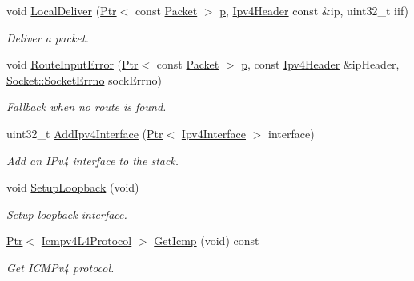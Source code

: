 \begin{DoxyCompactItemize}
void \hyperlink{classns3_1_1Ipv4L3Protocol_aa64669f000ce115efafd5e086995b4ff}{Local\+Deliver} (\hyperlink{classns3_1_1Ptr}{Ptr}$<$ const \hyperlink{classns3_1_1Packet}{Packet} $>$ \hyperlink{lte__link__budget__x2__handover__measures_8m_ac9de518908a968428863f829398a4e62}{p}, \hyperlink{classns3_1_1Ipv4Header}{Ipv4\+Header} const \&ip, uint32\+\_\+t iif)
\begin{DoxyCompactList}\small\item\em Deliver a packet. \end{DoxyCompactList}\item 
void \hyperlink{classns3_1_1Ipv4L3Protocol_a39611a6da4b2d975e3eae9cebf6da6eb}{Route\+Input\+Error} (\hyperlink{classns3_1_1Ptr}{Ptr}$<$ const \hyperlink{classns3_1_1Packet}{Packet} $>$ \hyperlink{lte__link__budget__x2__handover__measures_8m_ac9de518908a968428863f829398a4e62}{p}, const \hyperlink{classns3_1_1Ipv4Header}{Ipv4\+Header} \&ip\+Header, \hyperlink{classns3_1_1Socket_ada1328c5ae0c28cb2a982caf8f6d6cca}{Socket\+::\+Socket\+Errno} sock\+Errno)
\begin{DoxyCompactList}\small\item\em Fallback when no route is found. \end{DoxyCompactList}\item 
uint32\+\_\+t \hyperlink{classns3_1_1Ipv4L3Protocol_afd3f97720c2d1af22f05038fcdb6e089}{Add\+Ipv4\+Interface} (\hyperlink{classns3_1_1Ptr}{Ptr}$<$ \hyperlink{classns3_1_1Ipv4Interface}{Ipv4\+Interface} $>$ interface)
\begin{DoxyCompactList}\small\item\em Add an I\+Pv4 interface to the stack. \end{DoxyCompactList}\item 
void \hyperlink{classns3_1_1Ipv4L3Protocol_aa37b950d26063e4e7ee659e599c83bde}{Setup\+Loopback} (void)
\begin{DoxyCompactList}\small\item\em Setup loopback interface. \end{DoxyCompactList}\item 
\hyperlink{classns3_1_1Ptr}{Ptr}$<$ \hyperlink{classns3_1_1Icmpv4L4Protocol}{Icmpv4\+L4\+Protocol} $>$ \hyperlink{classns3_1_1Ipv4L3Protocol_a4dd2b3a24817ed50e7a6f41a5657551c}{Get\+Icmp} (void) const 
\begin{DoxyCompactList}\small\item\em Get I\+C\+M\+Pv4 protocol. \end{DoxyCompactList}\item 

\end{DoxyCompactItemize}
